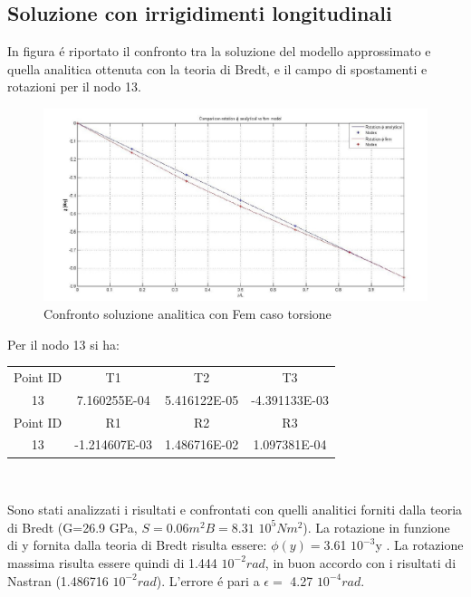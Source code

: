 \documentclass[12pt,a4paper]{article}
\begin{document}
\subsection{Soluzione con irrigidimenti longitudinali}
 In figura \'e riportato il confronto tra la soluzione del modello approssimato e
quella analitica ottenuta con la teoria di Bredt, e il campo di spostamenti e rotazioni per il nodo 13.
\begin{figure}[htbp]
\centering
\includegraphics[width=150mm]{Immagini/confrontoanaliticotorsione}
\caption{Confronto soluzione analitica con Fem caso torsione}
\end{figure}
\newpage
Per il nodo 13 si ha:\\
 \begin{center}
 \begin{tabular}{c c c c}
 \hline
 Point ID& T1 & T2 & T3\\
 13 & 7.160255E-04 & 5.416122E-05 & -4.391133E-03\\
 \hline
 Point ID & R1 & R2 & R3\\
 13 & -1.214607E-03 & 1.486716E-02 & 1.097381E-04\\
 \hline
 \end{tabular}\\ 
 \end{center}
Sono stati analizzati i risultati e confrontati con quelli analitici forniti dalla teoria di Bredt (G=26.9 GPa,
$S=0.06 m^2  B=8.31$ $10^5 Nm^2$). La rotazione in funzione di y fornita dalla teoria di Bredt risulta essere:
$\phi(y)=$3.61 $10^{-3}$y . La rotazione massima risulta essere quindi di 1.444 $10^{-2} rad$, in buon accordo con i risultati
di Nastran (1.486716 $10^{-2} rad$). L'errore \'e pari a $\epsilon=$  4.27 $10^{-4} rad$.
\end{document}
